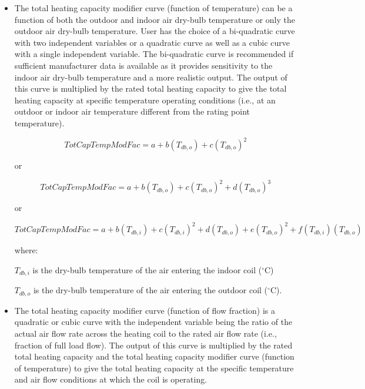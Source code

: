\begin{itemize}
  \item
The total heating capacity modifier curve (function of temperature) can be a function of both the outdoor and indoor air dry-bulb temperature or only the outdoor air dry-bulb temperature. User has the choice of a bi-quadratic curve with two independent variables or a quadratic curve as well as a cubic curve with a single independent variable. The bi-quadratic curve is recommended if sufficient manufacturer data is available as it provides sensitivity to the indoor air dry-bulb temperature and a more realistic output. The output of this curve is multiplied by the rated total heating capacity to give the total heating capacity at specific temperature operating conditions (i.e., at an outdoor or indoor air temperature different from the rating point temperature).

\begin{equation}
TotCapTempModFac = a + b\left( {{T_{db,o}}} \right) + c{\left( {{T_{db,o}}} \right)^2}
\label{eq:SSEHPDXAirHeatCoilTotCapTempModFac}
\end{equation}

or

\begin{equation}
TotCapTempModFac = a + b\left( {{T_{db,o}}} \right) + c{\left( {{T_{db,o}}} \right)^2} + d{\left( {{T_{db,o}}} \right)^3}
\end{equation}

or

\begin{equation}
TotCapTempModFac = a + b\left( {{T_{db,i}}} \right) + c{\left( {{T_{db,i}}} \right)^2} + d\left( {{T_{db,o}}} \right) + e{\left( {{T_{db,o}}} \right)^2} + f\left( {{T_{db,i}}} \right)\left( {{T_{db,o}}} \right)
\end{equation}

where:

\({T_{db,i}}\) is the dry-bulb temperature of the air entering the indoor coil (\(^{\circ}\)C)

\({T_{db,o}}\) is the dry-bulb temperature of the air entering the outdoor coil (\(^{\circ}\)C).

  \item
The total heating capacity modifier curve (function of flow fraction) is a quadratic or cubic curve with the independent variable being the ratio of the actual air flow rate across the heating coil to the rated air flow rate (i.e., fraction of full load flow). The output of this curve is multiplied by the rated total heating capacity and the total heating capacity modifier curve (function of temperature) to give the total heating capacity at the specific temperature and air flow conditions at which the coil is operating.


\end{itemize}
